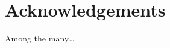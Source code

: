 \documentclass{article}
\begin{document}
\section{Acknowledgements}      %
Among the many\dots


%
%
%
%




% 
% 
\end{document}
